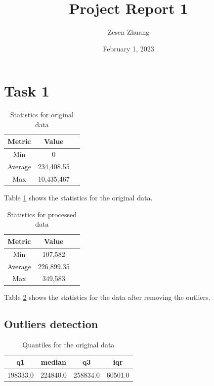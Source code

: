 \documentclass[11pt,letterpaper]{article}
\title{Project Report 1}
\date{February 1, 2023}
\author{Zesen Zhuang}
\begin{document}
\maketitle

\setlength{\parindent}{0pt}
\setlength{\parskip}{0.5em}

\section*{Task 1}

\begin{table}[h]
    \centering
    \begin{tabular}{c c c}
        \hline
        \textbf{Metric} & \textbf{Value} \\
        \hline
        Min             & 0              \\
        Average         & 234,408.55     \\
        Max             & 10,435,467     \\
        \hline
    \end{tabular}
    \caption{Statistics for original data}
    \label{tab:original}
\end{table}

Table \ref{tab:original} shows the statistics for the original data.

\begin{table}[h]
    \centering
    \begin{tabular}{c c c}
        \hline
        \textbf{Metric} & \textbf{Value} \\
        \hline
        Min             & 107,582        \\
        Average         & 226,899.35     \\
        Max             & 349,583        \\
        \hline
    \end{tabular}
    \caption{Statistics for processed data}
    \label{tab:processed}
\end{table}

Table \ref{tab:processed} shows the statistics for the data after removing the outliers.

\subsection*{Outliers detection}

\begin{table}[h]
    \centering
    \begin{tabular}{c c c c}
        \hline
        \textbf{q1} & \textbf{median} & \textbf{q3} & \textbf{iqr} \\ [0.5ex]
        \hline
        198333.0    & 224840.0        & 258834.0    & 60501.0      \\ [1ex]
        \hline
    \end{tabular}
    \caption{Quantiles for the original data}
    \label{tab:quantiles}
\end{table}
\end{document}
